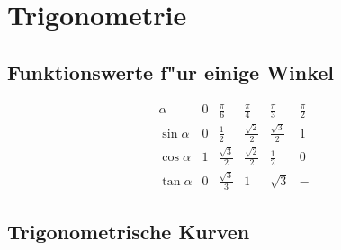 \documentclass[german, 10pt, a4paper, twocolumn]{scrartcl}
\theoremstyle{definition}
\begin{document}
\pagebreak

\appendix

\section{Trigonometrie}

\subsection{Funktionswerte f"ur einige Winkel}

\begin{displaymath}
\renewcommand{\arraystretch}{1.7}
\begin{array}{l||lllll}
 \alpha &		0 &		\frac{\pi}{6} &		\frac{\pi}{4} &		\frac{\pi}{3} &		\frac{\pi}{2}\\ \hline\hline
 \sin\alpha &		0 &		\frac{1}{2} &		\frac{\sqrt{2}}{2} &	\frac{\sqrt{3}}{2} &	1\\
 \cos\alpha &		1 &		\frac{\sqrt{3}}{2} & 	\frac{\sqrt{2}}{2} &	\frac{1}{2} &		0\\
 \tan\alpha &		0 &		\frac{\sqrt{3}}{3} &	1 &			\sqrt{3} &		-
\end{array}
\end{displaymath}

\subsection{Trigonometrische Kurven}
\end{document}
